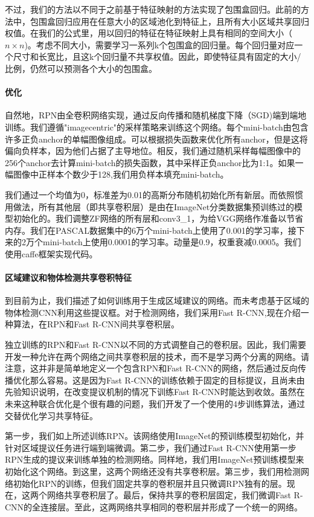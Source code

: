 \documentclass[12pt,a4paper,titlepage]{article}
\begin{document}
不过，我们的方法以不同于之前基于特征映射的方法实现了包围盒回归。此前的方法中，包围盒回归应用在任意大小的区域池化到特征上，且所有大小区域共享回归权值。在我们的公式里，用以回归的特征在特征映射上具有相同的空间大小（$n \times n$)。考虑不同大小，需要学习一系列k个包围盒的回归量。每个回归量对应一个尺寸和长宽比，且这k个回归量不共享权值。因此，即使特征具有固定的大小/比例，仍然可以预测各个大小的包围盒。

\paragraph{优化}
自然地，RPN由全卷积网络实现，通过反向传播和随机梯度下降（SGD)端到端地训练。我们遵循"imagecentric"的采样策略来训练这个网络。每个mini-batch由包含许多正负anchor的单幅图像组成。可以根据损失函数来优化所有anchor，但是这将偏向负样本，因为他们占据了主导地位。相反，我们通过随机采样每幅图像中的256个anchor去计算mini-batch的损失函数，其中采样正负anchor比为1:1。如果一幅图像中正样本个数少于128,我们用负样本填充mini-batch。\par

我们通过一个均值为0，标准差为0.01的高斯分布随机初始化所有新层。而依照惯用做法，所有其他层（即共享卷积层）是由在ImageNet分类数据集预训练过的模型初始化的。我们调整ZF网络的所有层和conv3\_1，为给VGG网络作准备以节省内存。我们在PASCAL数据集中的6万个mini-batch上使用了0.001的学习率，接下来的2万个mini-batch上使用0.0001的学习率。动量是0.9，权重衰减0.0005。我们使用caffe框架实现代码。

\paragraph{区域建议和物体检测共享卷积特征}
到目前为止，我们描述了如何训练用于生成区域建议的网络。而未考虑基于区域的物体检测CNN利用这些提议框。对于检测网络，我们采用Fast R-CNN,现在介绍一种算法，在RPN和Fast R-CNN间共享卷积层。\par

独立训练的RPN和Fast R-CNN以不同的方式调整自己的卷积层。因此，我们需要开发一种允许在两个网络之间共享卷积层的技术，而不是学习两个分离的网络。请注意，这并非是简单地定义一个包含RPN和Fast R-CNN的网络，然后通过反向传播优化那么容易。这是因为Fast R-CNN的训练依赖于固定的目标提议，且尚未由先验知识说明，在改变提议机制的情况下训练Fast R-CNN时能达到收敛。虽然在未来这种联合优化是个很有趣的问题，我们开发了一个使用的4步训练算法，通过交替优化学习共享特征。\par

第一步，我们如上所述训练RPN。该网络使用ImageNet的预训练模型初始化，并针对区域提议任务进行端到端微调。第二步，我们通过Fast R-CNN使用第一步RPN生成的提议来训练单独的检测网络。同样地，我们用ImageNet预训练模型来初始化这个网络。到这里，这两个网络还没有共享卷积层。第三步，我们用检测网络初始化RPN的训练，但我们固定共享的卷积层并且只微调RPN独有的层。现在，这两个网络共享卷积层了。最后，保持共享的卷积层固定，我们微调Fast R-CNN的全连接层。至此，这两网络共享相同的卷积层并形成了一个统一的网络。
\end{document}

